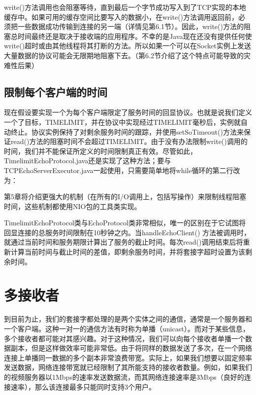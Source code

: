 		write()方法调用也会阻塞等待，直到最后一个字节成功写入到了TCP实现的本地缓存中。如果可用的缓存空间比要写入的数据小，在write()方法调用返回前，必须把一些数据成功传输到连接的另一端（详情见第6.1节）。因此，write()方法的阻塞总时间最终还是取决于接收端的应用程序。不幸的是Java现在还没有提供任何使write()超时或由其他线程将其打断的方法。所以如果一个可以在Socket实例上发送大量数据的协议可能会无限期地阻塞下去。（第6.2节介绍了这个特点可能导致的灾难性后果） 

	\subsection{限制每个客户端的时间}

		现在假设要实现一个为每个客户端限定了服务时间的回显协议。也就是说我们定义一个了目标，TIMELIMIT，并在协议中实现经过TIMELIMIT毫秒后，实例就自动终止。协议实例保持了对剩余服务时间的跟踪，并使用setSoTimeout()方法来保证read()方法的阻塞时间不会超过TIMELIMIT。由于没有办法限制write()调用的时间，我们并不能保证所定义的时间限制真正有效。尽管如此，TimelimitEchoProtocol.java还是实现了这种方法；要与TCPEchoServerExecutor.java一起使用，只需要简单地将while循环的第二行改为： 

		

		第5章将介绍更强大的机制（在所有的I/O调用上，包括写操作）来限制线程阻塞时间，这些机制都使用NIO包的工具类实现。 

		

		TimelimitEchoProtocol类与EchoProtocol类非常相似，唯一的区别在于它试图将回显连接的总服务时间限制在10秒钟之内。当handleEchoClient() 方法被调用时，就通过当前时间和服务期限计算出了服务的截止时间。每次read()调用结束后将重新计算当前时间与截止时间的差值，即剩余服务时间，并将套接字超时设置为该剩余时间。 

\section{多接收者}

	到目前为止，我们的套接字都处理的是两个实体之间的通信，通常是一个服务器和一个客户端。这种一对一的通信方法有时称为单播（unicast）。而对于某些信息，多个接收者都可能对其感兴趣。对于这种情况，我们可以向每个接收者单播一个数据副本，但是这样做效率可能非常低。由于将同样的数据发送了多次，在一个网络连接上单播同一数据的多个副本非常浪费带宽。实际上，如果我们想要以固定频率发送数据，网络连接带宽就已经限制了其所能支持的接收者数量。例如，如果我们的视频服务器以1Mbps的速率发送数据流，而其网络连接速率是3Mbps（良好的连接速率），那么该连接最多只能同时支持3个用户。 

